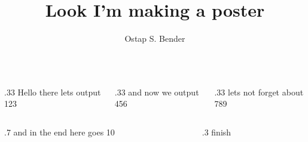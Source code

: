 \documentclass[xcolor={svgnames}]{beamer}
\title{Look I'm making a poster}
\author{Ostap S. Bender}
\institute{RUDN University}
\begin{document}
 \begin{frame}
 \begin{columns}
 \begin{column}{.33\textwidth}
Hello there lets output 123
 \end{column}

 \begin{column}{.33\textwidth}
and now we output 456
 \end{column}
 
 \begin{column}{.33\textwidth}
lets not forget about 789
\end{column}
 \end{columns}

 \begin{columns}
 \begin{column}{.7\textwidth}
 and in the end here goes 10
 \end{column}
 \begin{column}{.3\textwidth}
 finish
 \end{column}
\end{columns}
 \end{frame}
 
\end{document}

